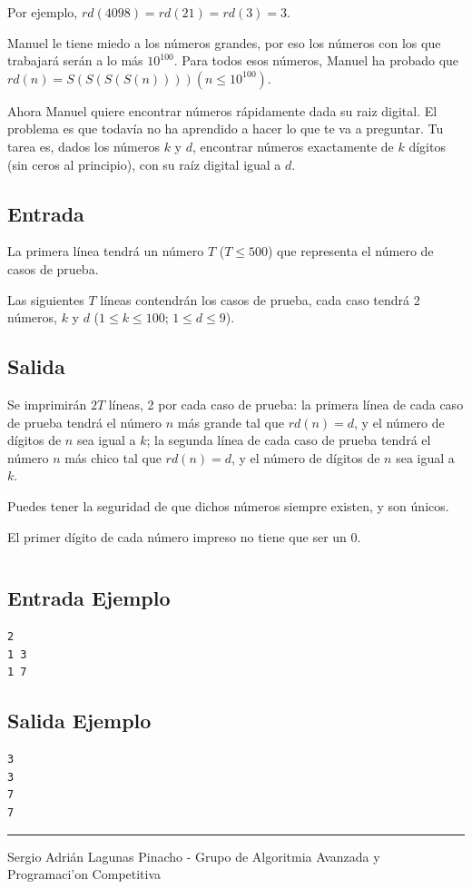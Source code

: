 \documentclass[letter,10pt]{article}
\newcommand{\lyxaddress}[1]{
\par {\raggedright #1
\vspace{1.4em}
\noindent\par}
}
\begin{document}
Por ejemplo, $rd(4098) = rd(21) = rd(3) = 3$.

Manuel le tiene miedo a los números grandes, por eso los números con los que trabajará serán a lo más $10^{100}$. Para todos esos números, Manuel ha probado que $rd(n) = S(S(S(S(n)))) (n \leq 10^{100})$.

Ahora Manuel quiere encontrar números rápidamente dada su raiz digital. El problema es que todavía no ha aprendido a hacer lo que te va a preguntar. Tu tarea es, dados los números $k$ y $d$, encontrar números exactamente de $k$ dígitos (sin ceros al principio), con su raíz digital igual a $d$.

\subsection*{Entrada}

La primera línea tendrá un número $T$ ($T \le 500$) que representa el número de casos de prueba.

Las siguientes $T$ líneas contendrán los casos de prueba, cada caso tendrá 2 números, $k$ y $d$ ($1 \le k \le 100$; $1 \leq d \le 9$).


\subsection*{Salida}

Se imprimirán $2T$ líneas, 2 por cada caso de prueba: la primera línea de cada caso de prueba tendrá el número $n$ más grande tal que $rd(n) = d$, y el número de dígitos de $n$ sea igual a $k$; la segunda línea de cada caso de prueba tendrá el número $n$ más chico tal que $rd(n) = d$, y el número de dígitos de $n$ sea igual a $k$.

Puedes tener la seguridad de que dichos números siempre existen, y son únicos.

El primer dígito de cada número impreso no tiene que ser un $0$.

\newpage

$$$$$$$$


\subsection*{Entrada Ejemplo}
\begin{verbatim}
2
1 3
1 7
\end{verbatim}

\subsection*{Salida Ejemplo}

\begin{verbatim}
3
3
7
7

\end{verbatim}

\noindent \rule[0.5ex]{1\columnwidth}{1pt}


\lyxaddress{Sergio Adrián Lagunas Pinacho - Grupo de Algoritmia Avanzada y Programaci'on Competitiva}
\end{document}
